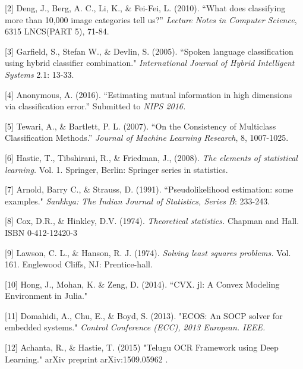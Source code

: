 \documentclass[12pt]{article}
\begin{document}
[2] Deng, J., Berg, A. C., Li, K., \& Fei-Fei, L. (2010). ``What does classifying more than 10,000 image categories tell us?'' \emph{Lecture Notes in Computer Science}, 6315 LNCS(PART 5), 71-84. 

[3] Garfield, S., Stefan W., \& Devlin, S. (2005). ``Spoken language classification using hybrid classifier combination." 
\emph{International Journal of Hybrid Intelligent Systems} 2.1: 13-33.

[4] Anonymous, A. (2016). ``Estimating mutual information in high dimensions via classification error.''  Submitted to 
\emph{NIPS 2016.}

[5] Tewari, A., \& Bartlett, P. L. (2007). ``On the Consistency of Multiclass Classification Methods.''
\emph{Journal of Machine Learning Research}, 8, 1007-1025.

[6] Hastie, T., Tibshirani, R., \& Friedman, J., (2008). \emph{The elements
of statistical learning.} Vol. 1. Springer, Berlin: Springer series in
statistics.

[7] Arnold, Barry C., \& Strauss, D.  (1991). ``Pseudolikelihood estimation: some examples." \emph{Sankhya: The Indian Journal of Statistics, Series B}: 233-243.

[8] Cox, D.R., \& Hinkley, D.V. (1974). \emph{Theoretical statistics.} Chapman and Hall. ISBN 0-412-12420-3

[9] Lawson, C. L., \& Hanson, R. J. (1974). \emph{Solving least squares problems.} Vol. 161. Englewood Cliffs, NJ: Prentice-hall.

[10] Hong, J., Mohan, K. \& Zeng, D. (2014). ``CVX. jl: A Convex Modeling Environment in Julia."

[11] Domahidi, A., Chu, E., \& Boyd, S. (2013). "ECOS: An SOCP solver for embedded systems." \emph{Control Conference (ECC), 2013 European. IEEE.}

[12] Achanta, R., \& Hastie, T. (2015) "Telugu OCR Framework using Deep Learning." arXiv preprint arXiv:1509.05962 .
\end{document}
